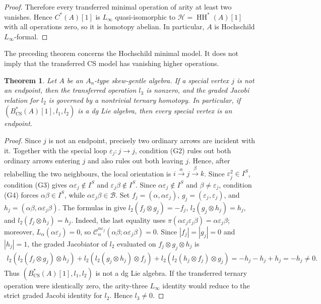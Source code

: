 \documentclass[11pt,a4paper,reqno]{amsart}
\newcommand{\mB}{\mathcal B}
\newcommand{\mC}{\mathcal C}
\newcommand{\HH}{\operatorname{HH}}
\newcommand{\para}[2]{(#1,#2)}
\newcommand{\ep}{\varepsilon}
\theoremstyle{plain}
\newtheorem{theorem}{Theorem}[section]
\theoremstyle{definition}
\numberwithin{equation}{section}
\begin{document}
\begin{proof}
		Therefore every transferred minimal operation of arity at least two
		vanishes. Hence $C^*(A)[1]$ is $L_\infty$ quasi-isomorphic to
		$\mathcal H=\HH^*(A)[1]$ with all operations zero, so it is homotopy
		abelian. In particular, $A$ is Hochschild $L_\infty$-formal.
	\end{proof}
	
	The preceding theorem concerns the Hochschild minimal model.  It does not
	imply that the transferred CS model has vanishing higher operations.
	
	\begin{theorem}
		\label{thm:An-interior-special}
		Let $A$ be an $A_n$-type skew-gentle algebra. If a special vertex $j$
		is not an endpoint, then the transferred operation $l_3$ is nonzero,
		and the graded Jacobi relation for $l_2$ is governed by a nontrivial
		ternary homotopy.
		In particular, if
		$(B_{\mathrm{CS}}^*(A)[1],l_1,l_2)$
		is a dg Lie algebra, then every special vertex is an endpoint.
	\end{theorem}
	
	\begin{proof}
		Since $j$ is not an endpoint, precisely two ordinary arrows are incident
		with it.  Together with the special loop $\ep_j:j\to j$, condition
		\textup{(G2)} rules out both ordinary arrows entering $j$ and also rules out
		both leaving $j$.  Hence, after relabelling the two neighbours, the local
		orientation is $i\xrightarrow{\alpha}j\xrightarrow{\beta}k$.  Since
		$\ep_j^2\in I^S$, condition \textup{(G3)} gives
		$\alpha\ep_j\notin I^S$ and $\ep_j\beta\notin I^S$. Since
		$\alpha\ep_j\notin I^S$ and $\beta\neq\ep_j$, condition
		\textup{(G4)} forces $\alpha\beta\in I^S$, while
		$\alpha\ep_j\beta\in\mB$.
		Set $f_j=\para{\alpha}{\alpha\ep_j}$,
		$g_j=\para{\ep_j}{\ep_j}$, and
		$h_j=\para{\alpha\beta}{\alpha\ep_j\beta}$.
		The formulas in  give $l_2(f_j\otimes g_j)=-f_j$,
		$l_2(g_j\otimes h_j)=h_j$, and $l_2(f_j\otimes h_j)=h_j$.
		Indeed, the last equality uses
		$\pi(\alpha\ep_j\ep_j\beta)=\alpha\ep_j\beta$; moreover,
		$L_\alpha(\alpha\ep_j)=0$, so
		$\mC_\alpha^{\alpha\ep_j}(\alpha\beta;\alpha\ep_j\beta)=0$.  Since $|f_j|=|g_j|=0$ and $|h_j|=1$, the graded Jacobiator of $l_2$ evaluated on
		$f_j\otimes g_j\otimes h_j$ is
		\[
		\begin{aligned}
			l_2(l_2(f_j\otimes g_j)\otimes h_j)
			+l_2(l_2(g_j\otimes h_j)\otimes f_j)
			+l_2(l_2(h_j\otimes f_j)\otimes g_j)=-h_j-h_j+h_j
			=-h_j\neq0.
		\end{aligned}
		\]
		Thus $(B_{\mathrm{CS}}^*(A)[1],l_1,l_2)$ is not a dg Lie algebra.  If the transferred
		ternary operation were identically zero, the arity-three $L_\infty$ identity
		would reduce to the strict graded Jacobi identity for $l_2$.  Hence
		$l_3\neq0$.
	\end{proof}
	
\end{document}
